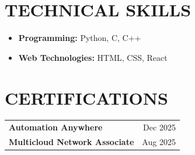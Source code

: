 \documentclass[a4paper,12pt]{article}
\begin{document}
\section*{TECHNICAL SKILLS}

\begin{itemize}
    \item \textbf{Programming:} Python, C, C++
    \item \textbf{Web Technologies:} HTML, CSS, React
\end{itemize}

\section*{CERTIFICATIONS}

\begin{tabularx}{\textwidth}{Xr}
\textbf{Automation Anywhere} & Dec 2025 \\
\textbf{Multicloud Network Associate} & Aug 2025 \\
\end{tabularx}
\end{document}
